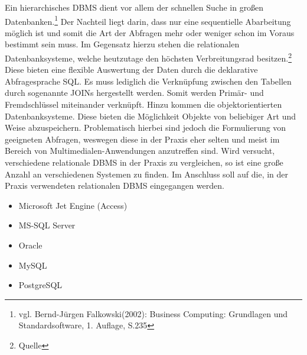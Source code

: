 Ein hierarchisches DBMS dient vor allem der schnellen Suche in großen Datenbanken.\footnote{vgl. Bernd-Jürgen Falkowski(2002): Business Computing: Grundlagen und Standardsoftware, 1. Auflage, S.235}
Der Nachteil liegt darin, dass nur eine sequentielle Abarbeitung möglich ist und somit die Art der Abfragen mehr oder weniger schon im Voraus bestimmt sein muss.
Im Gegensatz hierzu stehen die relationalen Datenbanksysteme, welche heutzutage den höchsten Verbreitungsrad besitzen.\footnote{Quelle}
Diese bieten eine flexible Auswertung der Daten durch die deklarative Abfragesprache SQL.
Es muss lediglich die Verknüpfung zwischen den Tabellen durch sogenannte JOINs hergestellt werden. Somit werden Primär- und Fremdschlüssel miteinander verknüpft.
Hinzu kommen die objektorientierten Datenbanksysteme. Diese bieten die Möglichkeit Objekte von beliebiger Art und Weise abzuspeichern.
Problematisch hierbei sind jedoch die Formulierung von geeigneten Abfragen, weswegen diese in der Praxis eher selten und meist im Bereich von Multimedialen-Anwendungen anzutreffen sind.%
Wird versucht, verschiedene relationale DBMS in der Praxis zu vergleichen, so ist eine große Anzahl an verschiedenen Systemen zu finden.
Im Anschluss soll auf die, in der Praxis verwendeten relationalen DBMS eingegangen werden.

\begin{itemize}
\item Microsoft Jet Engine (Access)
\item MS-SQL Server
\item Oracle
\item MySQL
\item PostgreSQL
\end{itemize}

